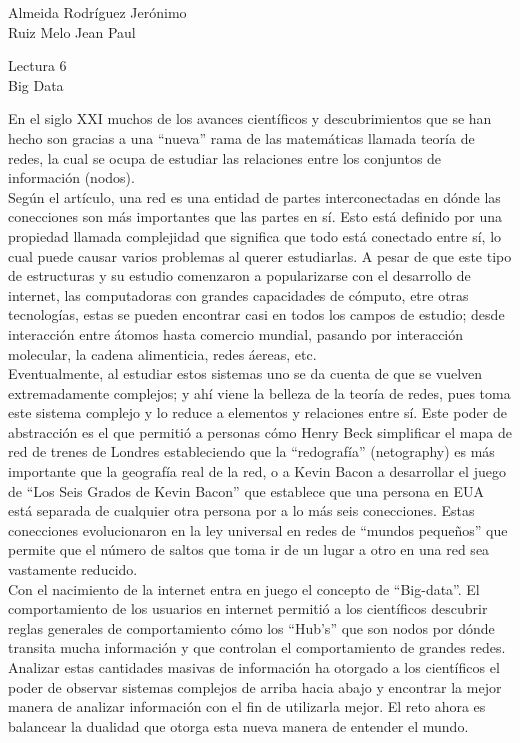 \documentclass[a4paper, 12pt]{report}
\begin{document}
\begin{flushright}
    Almeida Rodríguez Jerónimo\\
    Ruiz Melo Jean Paul
\end{flushright}

\begin{center}
    {\LARGE Lectura 6}\\
    {\LARGE Big Data}
\end{center}

En el siglo XXI muchos de los avances científicos y descubrimientos que se han
hecho son gracias a una ``nueva'' rama de las matemáticas llamada teoría de
redes, la cual se ocupa de estudiar las relaciones entre los conjuntos de
información (nodos).\\

Según el artículo, una red es una entidad de partes interconectadas en dónde las
conecciones son más importantes que las partes en sí. Esto está definido por una
propiedad llamada complejidad que significa que todo está conectado entre sí, lo
cual puede causar varios problemas al querer estudiarlas. A pesar de que este
tipo de estructuras y su estudio comenzaron a popularizarse con el desarrollo de
internet, las computadoras con grandes capacidades de cómputo, etre otras
tecnologías, estas se pueden encontrar casi en todos los campos de estudio;
desde interacción entre átomos hasta comercio mundial, pasando por interacción
molecular, la cadena alimenticia, redes áereas, etc.\\

Eventualmente, al estudiar estos sistemas uno se da cuenta de que se vuelven
extremadamente complejos; y ahí viene la belleza de la teoría de redes, pues toma
este sistema complejo y lo reduce a elementos y relaciones entre sí. Este poder
de abstracción es el que permitió a personas cómo Henry Beck simplificar el mapa
de red de trenes de Londres estableciendo que la ``redografía'' (netography) es
más importante que la geografía real de la red, o a Kevin Bacon a desarrollar el
juego de ``Los Seis Grados de Kevin Bacon'' que establece que una persona en EUA
está separada de cualquier otra persona por a lo más seis conecciones. Estas
conecciones evolucionaron en la ley universal en redes de ``mundos pequeños''
que permite que el número de saltos que toma ir de un lugar a otro en una red
sea vastamente reducido.\\

Con el nacimiento de la internet entra en juego el concepto de ``Big-data''.
El comportamiento de los usuarios en internet permitió a los
científicos descubrir reglas generales de comportamiento cómo los ``Hub's'' que
son nodos por dónde transita mucha información y que controlan el comportamiento
de grandes redes. Analizar estas cantidades
masivas de información ha otorgado a los científicos el poder de observar
sistemas complejos de arriba hacia abajo y encontrar la mejor manera de analizar
información con el fin de utilizarla mejor. El reto ahora es balancear la
dualidad que otorga esta nueva manera de entender el mundo.
\end{document}
